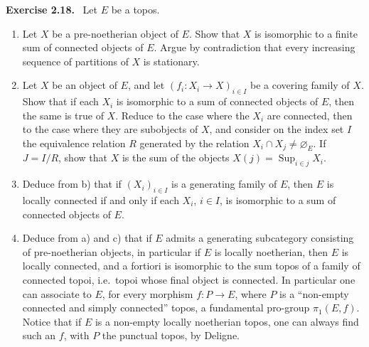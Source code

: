 \documentclass[11pt]{article}
\newcommand{\Sup}{\operatorname{Sup}}
\newcommand{\ie}{i.e.\ }
\newenvironment{remarktext}[1]{\par\medskip\noindent\textbf{#1.}\ }{\par\medskip}
\begin{document}
\begin{remarktext}{Exercise 2.18}
Let \(E\) be a topos.
\begin{enumerate}[label=\alph*)]
\item Let \(X\) be a pre-noetherian object of \(E\). Show that \(X\) is isomorphic to a finite sum of connected objects of \(E\). Argue by contradiction that every increasing sequence of partitions of \(X\) is stationary.
\item Let \(X\) be an object of \(E\), and let \((f_i:X_i\to X)_{i\in I}\) be a covering family of \(X\). Show that if each \(X_i\) is isomorphic to a sum of connected objects of \(E\), then the same is true of \(X\). Reduce to the case where the \(X_i\) are connected, then to the case where they are subobjects of \(X\), and consider on the index set \(I\) the equivalence relation \(R\) generated by the relation \(X_i\cap X_j\neq\varnothing_E\). If \(J=I/R\), show that \(X\) is the sum of the objects \(X(j)=\Sup_{i\in j}X_i\).
\item Deduce from b) that if \((X_i)_{i\in I}\) is a generating family of \(E\), then \(E\) is locally connected if and only if each \(X_i\), \(i\in I\), is isomorphic to a sum of connected objects of \(E\).
\item Deduce from a) and c) that if \(E\) admits a generating subcategory consisting of pre-noetherian objects, in particular if \(E\) is locally noetherian, then \(E\) is locally connected, and a fortiori is isomorphic to the sum topos of a family of connected topoi, \ie topoi whose final object is connected. In particular one can associate to \(E\), for every morphism \(f:P\to E\), where \(P\) is a ``non-empty connected and simply connected'' topos, a fundamental pro-group \(\pi_1(E,f)\). Notice that if \(E\) is a non-empty locally noetherian topos, one can always find such an \(f\), with \(P\) the punctual topos, by Deligne.
\end{enumerate}
\end{remarktext}

\bigskip
\end{document}
